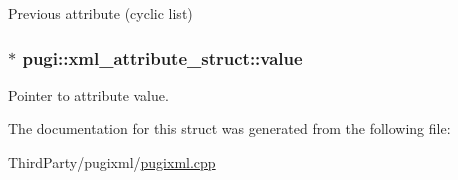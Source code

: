 Previous attribute (cyclic list) 

\hypertarget{structpugi_1_1xml__attribute__struct_ae652627d56cb9dcc0afdd1fbf6570364}{
\subsubsection[{value}]{$\ast$ pugi\-::xml\-\_\-attribute\-\_\-struct\-::value}}\label{structpugi_1_1xml__attribute__struct_ae652627d56cb9dcc0afdd1fbf6570364}


Pointer to attribute value. 



The documentation for this struct was generated from the following file\-:\begin{DoxyCompactItemize}
\item 
Third\-Party/pugixml/\hyperlink{pugixml_8cpp}{pugixml.\-cpp}\end{DoxyCompactItemize}

